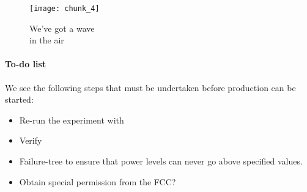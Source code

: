 \documentclass[fleqn,10pt]{article}
\begin{document}
\begin{figure}[H]
	\captionsetup{singlelinecheck = false, justification=justified}
	\centering
	\texttt{[image: chunk\_4]}
	\caption{
		We've got a wave\\
		in the air}
\end{figure}






\paragraph{To-do list}

We see the following steps that must be undertaken before production can be started:

\begin{itemize}
  \item Re-run the experiment with 
  \item Verify 
  \item Failure-tree to ensure that power levels can never go above specified values.
  \item Obtain special permission from the FCC?
\end{itemize}
\end{document}
